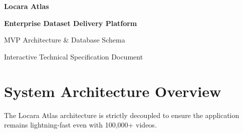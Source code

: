 \documentclass[a4paper,11pt]{article}
\begin{document}
\begin{titlepage}
    \centering
    \vspace*{4cm}
    {\Huge\bfseries\color{brandPrimary} Locara Atlas\par}
    \vspace{1cm}
    {\Large\bfseries Enterprise Dataset Delivery Platform\par}
    \vspace{2cm}
    {\large MVP Architecture \& Database Schema\par}
    \vspace{1.5cm}
    \vfill
    {\small \color{brandGray} Interactive Technical Specification Document\par}
\end{titlepage}

\tableofcontents
\newpage

\section{System Architecture Overview}
The Locara Atlas architecture is strictly decoupled to ensure the application remains lightning-fast even with 100,000+ videos. 
\end{document}
